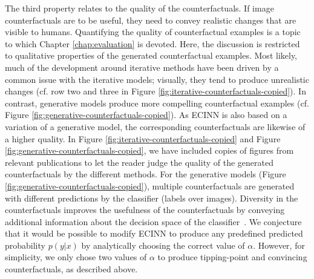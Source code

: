 \documentclass[11pt,a4paper,twoside,openright,final]{memoir}
\begin{document}
The third property relates to the quality of the counterfactuals.
If image counterfactuals are to be useful, they need to convey realistic changes that are visible to humans.
Quantifying the quality of counterfactual examples is a topic to which Chapter \ref{chap:evaluation} is devoted.
Here, the discussion is restricted to qualitative properties of the generated counterfactual examples.
Most likely, much of the development around iterative methods have been driven by a common issue with the iterative models; visually, they tend to produce unrealistic changes (cf. row two and three in Figure \ref{fig:iterative-counterfactuals-copied}).
In contrast, generative models produce more compelling counterfactual examples (cf. Figure \ref{fig:generative-counterfactuals-copied}).
As ECINN is also based on a variation of a generative model, the corresponding counterfactuals are likewise of a higher quality.
In Figure \ref{fig:iterative-counterfactuals-copied} and Figure \ref{fig:generative-counterfactuals-copied}, we have included copies of figures from relevant publications to let the reader judge the quality of the generated counterfactuals by the different methods.
For the generative models (Figure \ref{fig:generative-counterfactuals-copied}), multiple counterfactuals are generated with different predictions by the classifier (labels over images).
Diversity in the counterfactuals improves the usefulness of the counterfactuals by conveying additional information about the decision space of the classifier~\cite{Rodriguez2021}.
We conjecture that it would be possible to modify ECINN to produce any predefined predicted probability $p(y|x)$ by analytically choosing the correct value of $\alpha$.
However, for simplicity, we only chose two values of $\alpha$ to produce tipping-point and convincing counterfactuals, as described above.
\end{document}
